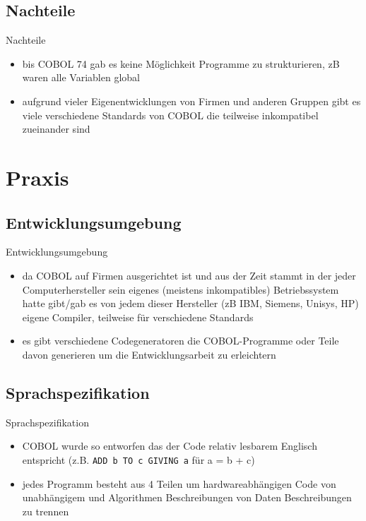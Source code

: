\documentclass{beamer}
\begin{document}
\subsection{Nachteile}

\begin{frame}{Nachteile}
	\begin{itemize}
		\item
		    bis COBOL 74 gab es keine M\"oglichkeit Programme zu strukturieren, zB waren alle Variablen global
		\item
			aufgrund vieler Eigenentwicklungen von Firmen und anderen Gruppen gibt es viele verschiedene Standards von COBOL die teilweise inkompatibel zueinander sind
	\end{itemize}
\end{frame}

\section{Praxis}

\subsection{Entwicklungsumgebung}

\begin{frame}{Entwicklungsumgebung}
	\begin{itemize}
		\item
			da COBOL auf Firmen ausgerichtet ist und aus der Zeit stammt in der jeder Computerhersteller sein eigenes (meistens inkompatibles) Betriebssystem hatte gibt/gab es von jedem dieser Hersteller (zB IBM, Siemens, Unisys, HP) eigene Compiler, teilweise f\"ur verschiedene Standards
		\item
			es gibt verschiedene Codegeneratoren die COBOL-Programme oder Teile davon generieren um die Entwicklungsarbeit zu erleichtern
	\end{itemize}
\end{frame}

\subsection{Sprachspezifikation}

\begin{frame}{Sprachspezifikation}
	\begin{itemize}
		\item
			COBOL wurde so entworfen das der Code relativ lesbarem Englisch entspricht (z.B. \texttt{ADD b TO c GIVING a} f\"ur a = b + c)
		\item
			jedes Programm besteht aus 4 Teilen um hardwareabh\"angigen Code von unabh\"angigem und Algorithmen Beschreibungen von Daten Beschreibungen zu trennen
	\end{itemize}
\end{frame}
\end{document}
